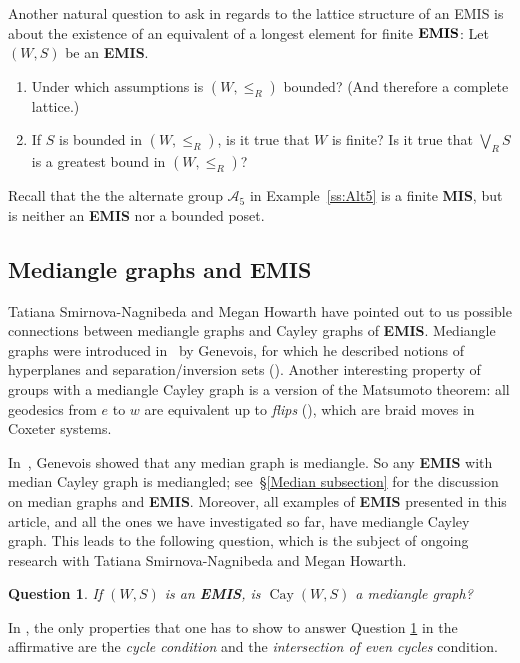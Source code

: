 \documentclass[A4paper, oneside]{amsart}
\newcommand{\id}{\textit{e}}
\newcommand{\Cay}{\operatorname{Cay}}
\newcommand{\EMIS}{\textnormal{\bf EMIS}\xspace}
\newcommand{\MIS}{\textnormal{\bf MIS}\xspace}
\newtheorem{question}{Question}
\theoremstyle{definition}
\begin{document}
\smallskip
Another natural question to ask in regards to the lattice structure of an EMIS is about the existence of an equivalent of a longest element for finite $\EMIS$: Let $(W,S)$ be an \EMIS.
	\begin{enumerate}
		\item Under which assumptions is $(W,\leq_R)$ bounded? (And therefore a complete lattice.)
		\item If $S$ is bounded in $(W,\leq_R)$, is it true that $W$ is finite? Is it true  that $\bigvee_R S$ is a greatest bound in $(W,\leq_R)$?
	\end{enumerate}    
Recall that the the alternate group $\mathcal A_5$ in Example~\ref{ss:Alt5}  is a finite \MIS, but is neither an \EMIS nor a bounded poset. 



\subsection{Mediangle graphs and \EMIS}\label{ss:Mediangleness}
    Tatiana Smirnova-Nagnibeda and Megan Howarth have pointed out to us possible connections between mediangle graphs and Cayley graphs of \EMIS. Mediangle graphs were introduced in~\cite{genevois2022rotation} by Genevois, for which he described notions of hyperplanes and separation/inversion sets (\cite[Theorem~3.9]{genevois2022rotation}). Another interesting property of groups with a mediangle Cayley graph is a version of the Matsumoto theorem: all geodesics from $\id$ to $w$ are equivalent up to {\em flips} (\cite[Lemma~3.3]{genevois2022rotation}), which are braid moves in Coxeter systems.
    
    In~\cite[Proposition~3.2]{genevois2022rotation}, Genevois showed that any median graph is mediangle. So any \EMIS with median Cayley graph is mediangled; see~\S\ref{Median subsection} for the discussion on median graphs and \EMIS.
    Moreover, all examples of \EMIS presented in this article, and all the ones we have investigated so far, have mediangle Cayley graph. This leads to the following question, which is the subject of ongoing research with Tatiana Smirnova-Nagnibeda and Megan Howarth.

    \begin{question}\label{qu:Mediangleness}
        If $(W,S)$ is an \EMIS, is $\Cay(W,S)$ a mediangle graph?
    \end{question}
    
    In \cite[Definition~1.4]{genevois2022rotation}, the only properties that one has to show to answer Question \ref{qu:Mediangleness} in the affirmative are the {\em cycle condition} and the {\em intersection of even cycles} condition. 
    
\end{document}
